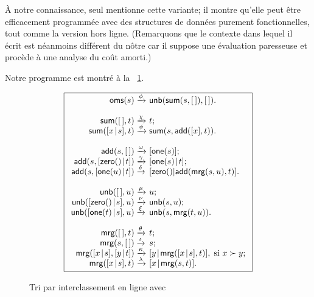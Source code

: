 À notre connaissance, seul \cite{Okasaki_1998a} mentionne cette
variante; il montre qu'elle peut être efficacement programmée avec des
structures de données purement fonctionnelles, tout comme la version
hors ligne. (Remarquons que le contexte dans lequel il écrit est
néanmoins différent du nôtre car il suppose une évaluation paresseuse
et procède à une analyse du coût amorti.)

Notre programme est montré à la \fig~\ref{fig:oms}.
\begin{figure}
\begin{equation*}
\boxed{%
\begin{array}{r@{\;}l@{\;}l}
\fun{oms}(s)   & \xrightarrow{\smash{\phi}}
               & \fun{unb}(\fun{sum}(s,\el),\el).\\
\\
\fun{sum}(\el,t)         & \xrightarrow{\smash{\chi}} & t;\\
\fun{sum}(\cons{x}{s},t) & \xrightarrow{\smash{\psi}}
                         & \fun{sum}(s,\fun{add}([x],t)).\\
\\
\fun{add}(s,\el) & \xrightarrow{\smash{\omega}} & [\fun{one}(s)];\\
\fun{add}(s,\cons{\fun{zero}()}{t})
                    & \xrightarrow{\smash{\gamma}}
                    & \cons{\fun{one}(s)}{t};\\
\fun{add}(s,\cons{\fun{one}(u)}{t}) & \xrightarrow{\smash{\delta}}
                    & [\fun{zero}()|\fun{add}(\fun{mrg}(s,u),t)].\\
\\
\fun{unb}(\el,u) & \xrightarrow{\smash{\mu}} & u;\\
\fun{unb}(\cons{\fun{zero}()}{s},u)
                 & \xrightarrow{\smash{\nu}} & \fun{unb}(s,u);\\
\fun{unb}(\cons{\fun{one}(t)}{s},u)
                 & \xrightarrow{\smash{\xi}}
                 & \fun{unb}(s,\fun{mrg}(t,u)).\\
\\
\fun{mrg}(\el,t)         & \xrightarrow{\smash{\theta}} & t;\\
\fun{mrg}(s,\el)         & \xrightarrow{\smash{\iota}} & s;\\
\fun{mrg}(\cons{x}{s},\cons{y}{t}) & \xrightarrow{\smash{\kappa}}
                         & \cons{y}{\fun{mrg}(\cons{x}{s},t)},\;
                           \text{si \(x \succ y\)};\\
\fun{mrg}(\cons{x}{s},t) & \xrightarrow{\smash{\lambda}}
                         & \cons{x}{\fun{mrg}(s,t)}.
\end{array}}
\end{equation*}
\caption{Tri par interclassement en ligne avec }
\label{fig:oms}
\end{figure}
